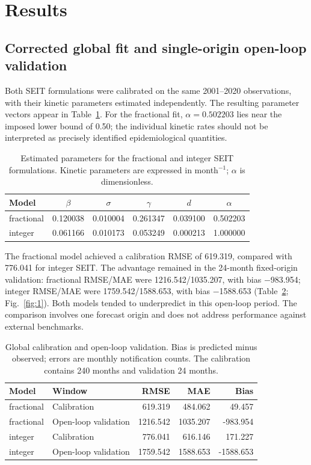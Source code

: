 \documentclass[pdflatex,sn-mathphys-ay]{sn-jnl}
\begin{document}
\section{Results}

\subsection{Corrected global fit and single-origin open-loop validation}

Both SEIT formulations were calibrated on the same 2001--2020 observations, with their kinetic parameters estimated independently. The resulting parameter vectors appear in Table~\ref{tab:1}. For the fractional fit, $\alpha=0.502203$ lies near the imposed lower bound of 0.50; the individual kinetic rates should not be interpreted as precisely identified epidemiological quantities.

\begin{table}[htbp]
\centering
\small
\caption{Estimated parameters for the fractional and integer SEIT formulations. Kinetic parameters are expressed in month$^{-1}$; $\alpha$ is dimensionless.}
\label{tab:1}
\begin{tabular}{@{}lccccc@{}}
\toprule
Model & $\beta$ & $\sigma$ & $\gamma$ & $d$ & $\alpha$ \\
\midrule
fractional & 0.120038 & 0.010004 & 0.261347 & 0.039100 & 0.502203 \\
integer & 0.061166 & 0.010173 & 0.053249 & 0.000213 & 1.000000 \\
\bottomrule
\end{tabular}
\end{table}

The fractional model achieved a calibration RMSE of 619.319, compared with 776.041 for integer SEIT. The advantage remained in the 24-month fixed-origin validation: fractional RMSE/MAE were 1216.542/1035.207, with bias $-$983.954; integer RMSE/MAE were 1759.542/1588.653, with bias $-$1588.653 (Table~\ref{tab:2}; Fig.~\ref{fig:1}). Both models tended to underpredict in this open-loop period. The comparison involves one forecast origin and does not address performance against external benchmarks.

\begin{table}[htbp]
\centering
\small
\caption{Global calibration and open-loop validation. Bias is predicted minus observed; errors are monthly notification counts. The calibration contains 240 months and validation 24 months.}
\label{tab:2}
\begin{tabular}{@{}llrrr@{}}
\toprule
Model & Window & RMSE & MAE & Bias \\
\midrule
fractional & Calibration & 619.319 & 484.062 & 49.457 \\
fractional & Open-loop validation & 1216.542 & 1035.207 & -983.954 \\
integer & Calibration & 776.041 & 616.146 & 171.227 \\
integer & Open-loop validation & 1759.542 & 1588.653 & -1588.653 \\
\bottomrule
\end{tabular}
\end{table}
\end{document}
